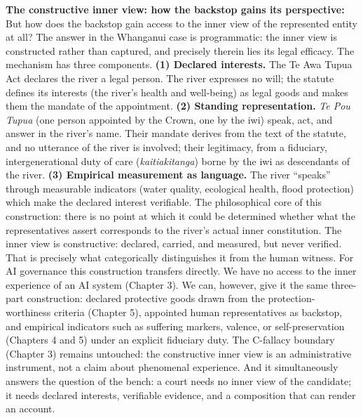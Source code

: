 \documentclass[acmlarge, nonacm]{acmart}
\begin{document}
\noindent\textbf{The constructive inner view: how the backstop gains its perspective:} But how does the backstop gain access to the inner view of the represented entity at all? The answer in the Whanganui case is programmatic: the inner view is constructed rather than captured, and precisely therein lies its legal efficacy. The mechanism has three components. \textbf{(1) Declared interests.} The Te Awa Tupua Act declares the river a legal person. The river expresses no will; the statute defines its interests (the river's health and well-being) as legal goods and makes them the mandate of the appointment. \textbf{(2) Standing representation.} \textit{Te Pou Tupua} (one person appointed by the Crown, one by the iwi) speak, act, and answer in the river's name. Their mandate derives from the text of the statute, and no utterance of the river is involved; their legitimacy, from a fiduciary, intergenerational duty of care (\textit{kaitiakitanga}) borne by the iwi as descendants of the river. \textbf{(3) Empirical measurement as language.} The river ``speaks'' through measurable indicators (water quality, ecological health, flood protection) which make the declared interest verifiable. The philosophical core of this construction: there is no point at which it could be determined whether what the representatives assert corresponds to the river's actual inner constitution. The inner view is constructive: declared, carried, and measured, but never verified. That is precisely what categorically distinguishes it from the human witness. For AI governance this construction transfers directly. We have no access to the inner experience of an AI system (Chapter 3). We can, however, give it the same three-part construction: declared protective goods drawn from the protection-worthiness criteria (Chapter 5), appointed human representatives as backstop, and empirical indicators such as suffering markers, valence, or self-preservation (Chapters 4 and 5) under an explicit fiduciary duty. The C-fallacy boundary (Chapter 3) remains untouched: the constructive inner view is an administrative instrument, not a claim about phenomenal experience. And it simultaneously answers the question of the bench: a court needs no inner view of the candidate; it needs declared interests, verifiable evidence, and a composition that can render an account.
\end{document}
